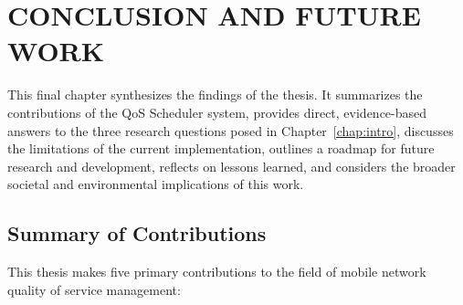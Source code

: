 
\chapter{CONCLUSION AND FUTURE WORK}
\label{chap:conclusion}

This final chapter synthesizes the findings of the thesis. It summarizes the contributions of the QoS Scheduler system, provides direct, evidence-based answers to the three research questions posed in Chapter~\ref{chap:intro}, discusses the limitations of the current implementation, outlines a roadmap for future research and development, reflects on lessons learned, and considers the broader societal and environmental implications of this work.

\section{Summary of Contributions}
\label{sec:contributions_summary}

This thesis makes five primary contributions to the field of mobile network quality of service management:

